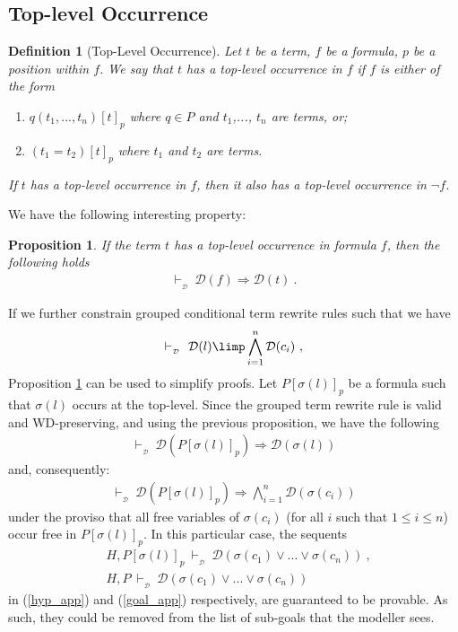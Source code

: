 \documentclass[copyright]{eptcs}
\newtheorem{proposition}[theorem]{Proposition}
\newtheorem{definition}[theorem]{Definition}
\begin{document}
\subsection{Top-level Occurrence}

\begin{definition}[Top-Level Occurrence]
Let $t$ be a term, $f$ be a formula, $p$ be a position within $f$. We say that $t$ has a top-level occurrence in $f$ if $f$ is either of the form 
\begin{enumerate}
\item $q(t_1,...,t_n)[t]_p$ where $q \in P$ and $t_1$,..., $t_n$ are terms, or; 
\item $(t_1=t_2)[t]_p$ where $t_1$ and $t_2$ are terms.  
\end{enumerate}
If $t$ has a top-level occurrence in $f$, then it also has a top-level occurrence in $\lnot f$.
\end{definition}
We have the following interesting property:
\begin{proposition}\label{toplevel_prop}
If the term $t$ has a top-level occurrence in formula $f$, then the following holds
\begin{eqnarray*}
\vdash_{_\mathcal{D}}~\mathcal{D}(f) \Rightarrow \mathcal{D}(t)~.
\end{eqnarray*}
\end{proposition}
If we further constrain grouped conditional term rewrite rules such that we have
\begin{eqnarray*}
\vdash_{_\mathcal{D}}~\mathcal{D}(l) \limp \bigwedge_{i=1}^{n}\mathcal{D}(c_i)~,
\end{eqnarray*}
Proposition \ref{toplevel_prop} can be used to simplify proofs. Let $P[\sigma(l)]_p$ be a formula such that $\sigma(l)$ occurs at the top-level. Since the grouped term rewrite rule is valid and WD-preserving, and using the previous proposition, we have the following
\begin{eqnarray*}
\vdash_{_\mathcal{D}}~\mathcal{D}(P[\sigma(l)]_p) \Rightarrow \mathcal{D}(\sigma(l))
\end{eqnarray*}
and, consequently:
\begin{eqnarray*}
\vdash_{_\mathcal{D}}~\mathcal{D}(P[\sigma(l)]_p) \Rightarrow \bigwedge_{i=1}^n \mathcal{D}(\sigma(c_i))
\end{eqnarray*}
under the proviso that all free variables of $\sigma(c_i)$ (for all $i$ such that $1 \leq i \leq n$) occur free in $P[\sigma(l)]_p$. In this particular case, the sequents
\begin{eqnarray*}
&H, P[\sigma(l)]_p~\vdash_{_\mathcal{D}}~\mathcal{D}(\sigma(c_1)\lor ...\lor \sigma(c_n))~,\\
&H, P~\vdash_{_\mathcal{D}}~\mathcal{D}(\sigma(c_1)\lor ...\lor \sigma(c_n))
\end{eqnarray*}
in (\ref{hyp_app}) and (\ref{goal_app}) respectively, are guaranteed to be provable. As such, they could be removed from the list of sub-goals that the modeller sees.
\end{document}
